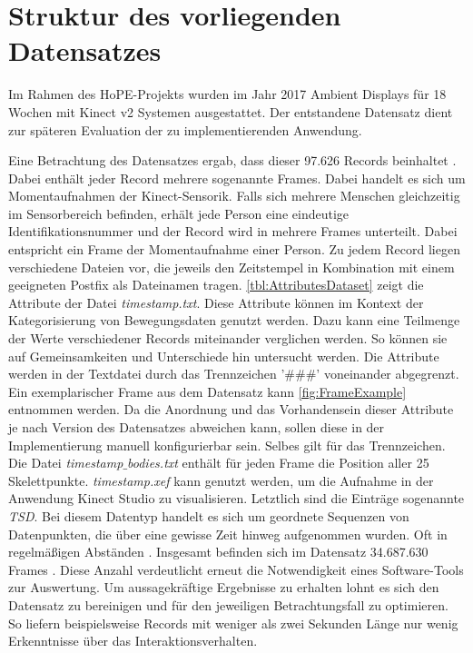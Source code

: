 \section{Struktur des vorliegenden Datensatzes}
\label{2-StrukturDatensatz}
Im Rahmen des HoPE-Projekts wurden im Jahr 2017 Ambient Displays für 18 Wochen mit Kinect v2 Systemen ausgestattet.
Der entstandene Datensatz dient zur späteren Evaluation der zu implementierenden Anwendung.

Eine Betrachtung des Datensatzes ergab, dass dieser 97.626 Records beinhaltet \citep{temiz_konzeption_2022}.
Dabei enthält jeder Record mehrere sogenannte Frames.
Dabei handelt es sich um Momentaufnahmen der Kinect-Sensorik.
Falls sich mehrere Menschen gleichzeitig im Sensorbereich befinden,
erhält jede Person eine eindeutige Identifikationsnummer
und der Record wird in mehrere Frames unterteilt.
Dabei entspricht ein Frame der Momentaufnahme einer Person.
Zu jedem Record liegen verschiedene Dateien vor,
die jeweils den Zeitstempel in Kombination mit einem geeigneten Postfix als Dateinamen tragen.
\autoref{tbl:AttributesDataset} zeigt die Attribute der Datei \emph{timestamp.txt}.
Diese Attribute können im Kontext der Kategorisierung von Bewegungsdaten genutzt werden.
Dazu kann eine Teilmenge der Werte verschiedener Records miteinander verglichen werden.
So können sie auf Gemeinsamkeiten und Unterschiede hin untersucht werden.
Die Attribute werden in der Textdatei durch das Trennzeichen '\#\#\#' voneinander abgegrenzt.
Ein exemplarischer Frame aus dem Datensatz kann \autoref{fig:FrameExample} entnommen werden.
Da die Anordnung und das Vorhandensein dieser Attribute je nach Version des Datensatzes abweichen kann,
sollen diese in der Implementierung manuell konfigurierbar sein.
Selbes gilt für das Trennzeichen.
Die Datei \emph{timestamp$\_$bodies.txt} enthält für jeden Frame die Position aller 25 Skelettpunkte.
\emph{timestamp.xef} kann genutzt werden, um die Aufnahme in der Anwendung Kinect Studio zu visualisieren.
Letztlich sind die Einträge sogenannte \emph{\ac{TSD}}.
Bei diesem Datentyp handelt es sich um geordnete Sequenzen von Datenpunkten,
die über eine gewisse Zeit hinweg aufgenommen wurden.
Oft in regelmäßigen Abständen \citep{ali_clustering_2019}.
Insgesamt befinden sich im Datensatz 34.687.630 Frames \citep{temiz_konzeption_2022}.
Diese Anzahl verdeutlicht erneut die Notwendigkeit eines Software-Tools zur Auswertung.
Um aussagekräftige Ergebnisse zu erhalten lohnt es sich den Datensatz zu bereinigen
und für den jeweiligen Betrachtungsfall zu optimieren.
So liefern beispielsweise Records mit weniger als zwei Sekunden Länge nur wenig Erkenntnisse über das Interaktionsverhalten.
